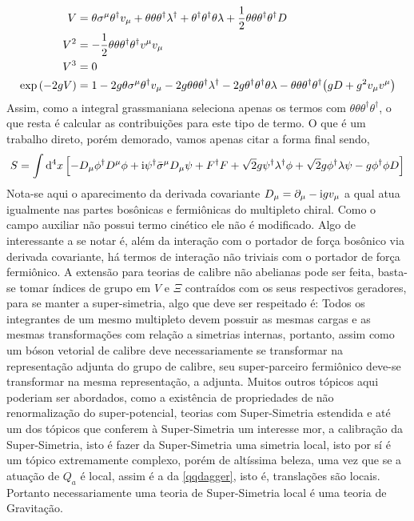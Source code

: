 \begin{align*}
    V&=\theta\sigma^\mu\theta^\dagger v_\mu+\theta\theta\theta^\dagger\lambda^\dagger+\theta^\dagger\theta^\dagger\theta\lambda+\frac12\theta\theta\theta^\dagger\theta^\dagger D\\
    V^2&=-\frac12\theta\theta\theta^\dagger\theta^\dagger v^\mu v_\mu\\
    V^3&=0\\
    \exp\qty(-2gV)&=1-2g\theta\sigma^\mu\theta^\dagger v_\mu-2g\theta\theta\theta^\dagger\lambda^\dagger-2g\theta^\dagger\theta^\dagger\theta\lambda-\theta\theta\theta^\dagger\theta^\dagger\qty(g D+g^2v_\mu v^\mu)
\end{align*}
Assim, como a integral grassmaniana seleciona apenas os termos com $\theta\theta\theta^\dagger\theta^\dagger$, o que resta é calcular as contribuições para este tipo de termo. O que é um trabalho direto, porém demorado, vamos 
apenas citar a forma final sendo,
\begin{align*}
    S=\int\dd[4]{x}\qty[-D_\mu\phi^\dagger D^\mu\phi+\textnormal{i}\psi^\dagger{\bar\sigma}^\mu D_\mu\psi+F^\dagger F+\sqrt 2 g\psi^\dagger\lambda^\dagger\phi+\sqrt 2 g\phi^\dagger\lambda\psi-g\phi^\dagger\phi D]
\end{align*}
Nota-se aqui o aparecimento da derivada covariante $D_\mu=\partial_\mu-\textnormal{i} g v_\mu$ a qual atua igualmente nas partes bosônicas e fermiônicas do multipleto chiral. Como o campo auxiliar não possui termo cinético ele não é modificado. 
Algo de interessante a se notar é, além da interação com o portador de força bosônico via derivada covariante, há termos de interação não triviais com o portador de força fermiônico. A extensão para teorias de calibre não abelianas pode ser feita, 
basta-se tomar índices de grupo em $V$ e $\Xi$ contraídos com os seus respectivos geradores, para se manter a super-simetria, algo que deve ser respeitado é: Todos os integrantes de um mesmo multipleto devem possuir as mesmas cargas e as mesmas transformações 
com relação a simetrias internas, portanto, assim como um bóson vetorial de calibre deve necessariamente se transformar na representação adjunta do grupo de calibre, seu super-parceiro fermiônico deve-se transformar na mesma representação, a adjunta.
Muitos outros tópicos aqui poderiam ser abordados, como a existência de propriedades de não renormalização do super-potencial, teorias com Super-Simetria estendida e até um dos tópicos que conferem à Super-Simetria um interesse mor, a calibração da 
Super-Simetria, isto é fazer da Super-Simetria uma simetria local, isto por sí é um tópico extremamente complexo, porém de altíssima beleza, uma vez que se a atuação de $Q_a$ é local, assim é a da \cref{qqdagger}, isto é, translações são locais. Portanto necessariamente uma teoria de Super-Simetria local é uma teoria de Gravitação.